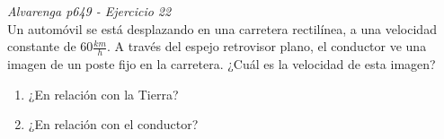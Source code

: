 \textit{Alvarenga p649 - Ejercicio 22}\\Un automóvil se está desplazando en una carretera rectilínea, a una velocidad constante de $60 \frac{km}{h}$. A través del espejo retrovisor plano, el conductor ve una imagen de un poste fijo en la carretera. ¿Cuál es la velocidad de esta imagen?
\begin{enumerate}
    \item ¿En relación con la Tierra?
    \item ¿En relación con el conductor?
\end{enumerate}